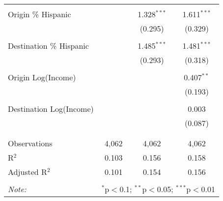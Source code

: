 \begin{table}[!htbp]
\begin{tabular}{@{\extracolsep{5pt}}lccc}
  & & & \\ 
 Origin \% Hispanic &  & 1.328$^{***}$ & 1.611$^{***}$ \\ 
  &  & (0.295) & (0.329) \\ 
  & & & \\ 
 Destination \% Hispanic &  & 1.485$^{***}$ & 1.481$^{***}$ \\ 
  &  & (0.293) & (0.318) \\ 
  & & & \\ 
 Origin Log(Income) &  &  & 0.407$^{**}$ \\ 
  &  &  & (0.193) \\ 
  & & & \\ 
 Destination Log(Income) &  &  & 0.003 \\ 
  &  &  & (0.087) \\ 
  & & & \\ 
\hline \\[-1.8ex] 
Observations & 4,062 & 4,062 & 4,062 \\ 
R$^{2}$ & 0.103 & 0.156 & 0.158 \\ 
Adjusted R$^{2}$ & 0.101 & 0.154 & 0.156 \\ 
\hline 
\hline \\[-1.8ex] 
\textit{Note:}  & \multicolumn{3}{r}{$^{*}$p$<$0.1; $^{**}$p$<$0.05; $^{***}$p$<$0.01} \\ 
\end{tabular} 
\end{table} 
